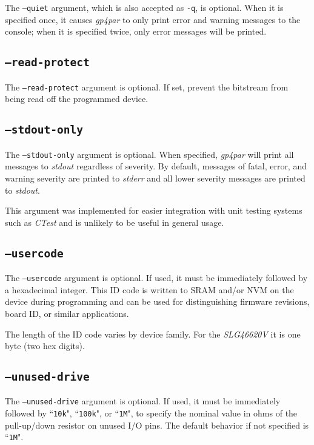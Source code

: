 \documentclass[11pt]{article}
\newcommand{\namestyle}[1]{\textit{#1}}
\newcommand{\tokenstyle}[1]{\texttt{#1}}
\begin{document}
The \texttt{--quiet} argument, which is also accepted as \texttt{-q}, is optional. When it is specified once, it
causes \namestyle{gp4par} to only print error and warning messages to the console; when it is specified twice,
only error messages will be printed.

\subsection{\texttt{--read-protect}}

The \texttt{--read-protect} argument is optional. If set, prevent the bitstream from being read off the programmed
device.

\subsection{\texttt{--stdout-only}}

The \texttt{--stdout-only} argument is optional. When specified, \namestyle{gp4par} will print all messages to
\namestyle{stdout} regardless of severity. By default, messages of fatal, error, and warning severity are printed to
\namestyle{stderr} and all lower severity messages are printed to \namestyle{stdout}.

This argument was implemented for easier integration with unit testing systems such as \namestyle{CTest} and is
unlikely to be useful in general usage.

\subsection{\texttt{--usercode}}

The \texttt{--usercode} argument is optional. If used, it must be immediately followed by a hexadecimal integer. This
ID code is written to SRAM and/or NVM on the device during programming and can be used for distinguishing firmware
revisions, board ID, or similar applications.

The length of the ID code varies by device family. For the \namestyle{SLG46620V} it is one byte (two hex digits).

\subsection{\texttt{--unused-drive}}

The \texttt{--unused-drive} argument is optional. If used, it must be immediately followed by ``\tokenstyle{10k}",
``\tokenstyle{100k}", or ``\tokenstyle{1M}", to specify the nominal value in ohms of the pull-up/down resistor on
unused I/O pins. The default behavior if not specified is ``\tokenstyle{1M}".
\end{document}
